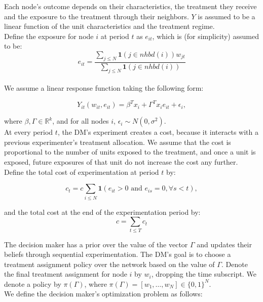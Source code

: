 \documentclass[12pt,a4paper]{article}
\begin{document}
Each node's outcome depends on their characteristics, the treatment they receive and the exposure to the treatment through their neighbors. $Y$ is assumed to be a linear function of the unit characteristics and the treatment regime. \\

Define the exposure for node $i$ at period $t$ as $e_{it}$, which is (for simplicity) assumed to be: 
$$e_{it} = \frac { \sum_{j \leq N}  \mathbf{1}(j \in nhbd(i)) w_{jt}}{ \sum_{j \leq N} \mathbf{1}(j \in nhbd(i)) }$$\\

We assume a linear response function taking the following form:

$$Y_{it}( w_{it}, e_{it}) = \beta^T x_i + \Gamma^T x_i e_{it} + \epsilon_i,$$

where $\beta, \Gamma \in \mathbb{R}^k$, and for all nodes $i$, $\epsilon_i \sim N(0, \sigma^2)$.\\

At every period $t$, the DM's experiment creates a cost, because it interacts with a previous experimenter's treatment allocation. We assume that the cost is proportional to the number of units exposed to the treatment, and once a unit is exposed, future exposures of that unit do not increase the cost any further. Define the total cost of experimentation at period $t$ by:

$$c_t = c \sum_{i \leq N} \mathbf{1}\left( e_{it} > 0 \mbox{ and } e_{is}=0,  \forall s<t \right) ,$$

and the total cost at the end of the experimentation period by:\\

$$c= \sum_{t \leq T} c_t  $$

The decision maker has a prior over the value of the vector $\Gamma$ and updates their beliefs through sequential experimentation. The DM's goal is to choose a treatment assignment policy over the network based on the value of $\Gamma$. Denote the final treatment assignment for node $i$ by $w_i$, dropping the time subscript. We denote a policy by $\pi(\Gamma)$, where $\pi(\Gamma)=[w_1, \dots , w_N] \in \{0,1\}^N$.\\

We define the decision maker's optimization problem as follows:
\end{document}
